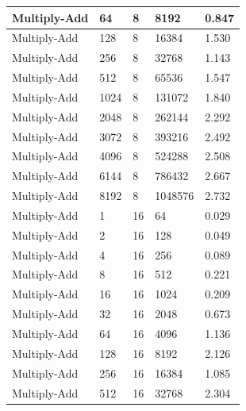\documentclass{article}
\begin{document}
\begin{longtable}{|l|l|l|l|l|}
Multiply-Add       & 64   & 8           & 8192              & 0.847             \\ \hline
Multiply-Add       & 128  & 8           & 16384             & 1.530             \\ \hline
Multiply-Add       & 256  & 8           & 32768             & 1.143             \\ \hline
Multiply-Add       & 512  & 8           & 65536             & 1.547             \\ \hline
Multiply-Add       & 1024 & 8           & 131072            & 1.840             \\ \hline
Multiply-Add       & 2048 & 8           & 262144            & 2.292             \\ \hline
Multiply-Add       & 3072 & 8           & 393216            & 2.492             \\ \hline
Multiply-Add       & 4096 & 8           & 524288            & 2.508             \\ \hline
Multiply-Add       & 6144 & 8           & 786432            & 2.667             \\ \hline
Multiply-Add       & 8192 & 8           & 1048576           & 2.732             \\ \hline
Multiply-Add       & 1    & 16          & 64                & 0.029             \\ \hline
Multiply-Add       & 2    & 16          & 128               & 0.049             \\ \hline
Multiply-Add       & 4    & 16          & 256               & 0.089             \\ \hline
Multiply-Add       & 8    & 16          & 512               & 0.221             \\ \hline
Multiply-Add       & 16   & 16          & 1024              & 0.209             \\ \hline
Multiply-Add       & 32   & 16          & 2048              & 0.673             \\ \hline
Multiply-Add       & 64   & 16          & 4096              & 1.136             \\ \hline
Multiply-Add       & 128  & 16          & 8192              & 2.126             \\ \hline
Multiply-Add       & 256  & 16          & 16384             & 1.085             \\ \hline
Multiply-Add       & 512  & 16          & 32768             & 2.304             \\ \hline

\end{longtable}
\end{document}

